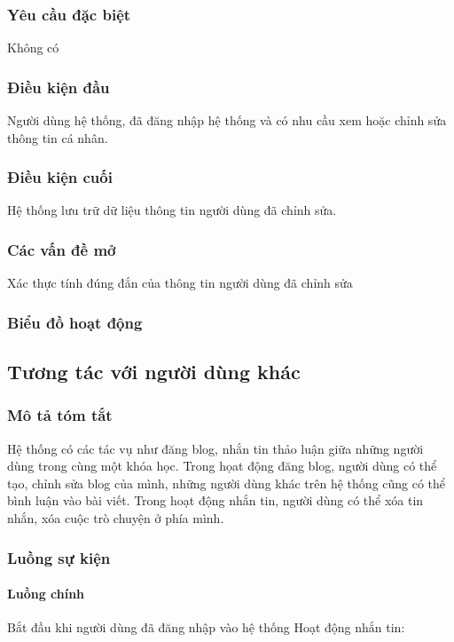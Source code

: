 \documentclass[./../main_file.tex]{subfiles}
\begin{document}
\subsubsection{Yêu cầu đặc biệt}
Không có

\subsubsection{Điều kiện đầu}
Người dùng hệ thống, đã đăng nhập hệ thống và có nhu cầu xem hoặc chỉnh sửa thông tin cá nhân.

\subsubsection{Điều kiện cuối}
Hệ thống lưu trữ dữ liệu thông tin người dùng đã chỉnh sửa.

\subsubsection{Các vấn đề mở}
Xác thực tính đúng đắn của thông tin người dùng đã chỉnh sửa

\subsubsection{Biểu đồ hoạt động}

\subsection{Tương tác với người dùng khác}
\subsubsection{Mô tả tóm tắt}
Hệ thống có các tác vụ như đăng blog, nhắn tin thảo luận giữa những người dùng trong cùng một khóa học. Trong họat động đăng blog, người dùng có thể tạo, chỉnh sửa blog của mình, những người dùng khác trên hệ thống cũng có thể bình luận vào bài viết. Trong hoạt động nhắn tin, người dùng có thể xóa tin nhắn, xóa cuộc trò chuyện ở phía mình. 
\subsubsection{Luồng sự kiện}
\paragraph{Luồng chính}
	Bắt đầu khi người dùng đã đăng nhập vào hệ thống
	Hoạt động nhắn tin:
\end{document}
